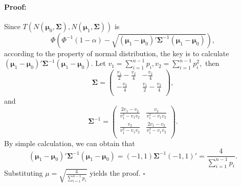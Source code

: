\documentclass[letterpaper]{article} %
\newenvironment{proof}{\paragraph{Proof:}}{\hfill$\square$}
\begin{document}
\begin{proof}
Since  $T(N(\pmb{\mu}_0,\pmb{\Sigma}),N(\pmb{\mu}_1,\pmb{\Sigma}))$ is
$$
\Phi(\Phi^{-1}(1-\alpha)-\sqrt{(\pmb{\mu}_1-\pmb{\mu}_0)'\pmb{\Sigma}^{-1}(\pmb{\mu}_1-\pmb{\mu}_0)}),
$$ 
according to the property of normal distribution, the key is to calculate
$(\pmb{\mu}_1-\pmb{\mu}_0)'\pmb{\Sigma}^{-1} (\pmb{\mu}_1-\pmb{\mu}_0)$.
Let $v_1 = \sum_{i=1}^{n-1} p_i, v_2 = \sum_{i=1}^{n-1}p_i^2,$ then
$$\pmb{\Sigma} =  \left(
\begin{array}{cc}
\frac{v_1}{2}-\frac{v_2}{4} & -\frac{v_2}{4} \\
-\frac{v_2}{4} & \frac{v_1}{2}-\frac{v_2}{4} \\
\end{array}
\right),$$
and
$$\pmb{\Sigma}^{-1} =  \left(
\begin{array}{cc}
\frac{2v_1-v_2}{v_1^2-v_1v_2} & \frac{v_2}{v_1^2-v_1v_2} \\
\frac{v_2}{v_1^2-v_1v_2} & \frac{2v_1-v_2}{v_1^2-v_1v_2} \\
\end{array}
\right).$$
By simple calculation, we can obtain that
$$
(\pmb{\mu}_1-\pmb{\mu}_0)'\pmb{\Sigma}^{-1} (\pmb{\mu}_1-\pmb{\mu}_0)= (-1,1) \pmb{\Sigma}^{-1}(-1,1)' = \frac{4}{\sum_{i=1}^{n-1}p_i}.
$$
Substituting $\mu= \sqrt{\frac{4}{\sum_{i=1}^{n-1}p_i}}$ yields the proof.
\end{proof}
\end{document}
